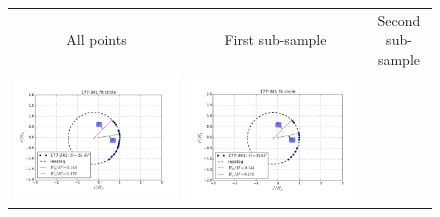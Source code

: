 \begin{figure}
\begin{tabular}{@{}c@{}c@{}c@{}}
 
All points & First sub-sample & Second sub-sample \\ \includegraphics[clip]{../../read-shapes/LV-bowshocks-xyfancy-positionswill-177-341} & \includegraphics[clip]{../../read-shapes/Multi-Fit/samp00/LV-bowshocks-xyfancy-positionssamp00-177-341} &

\end{tabular}
\end{figure}
